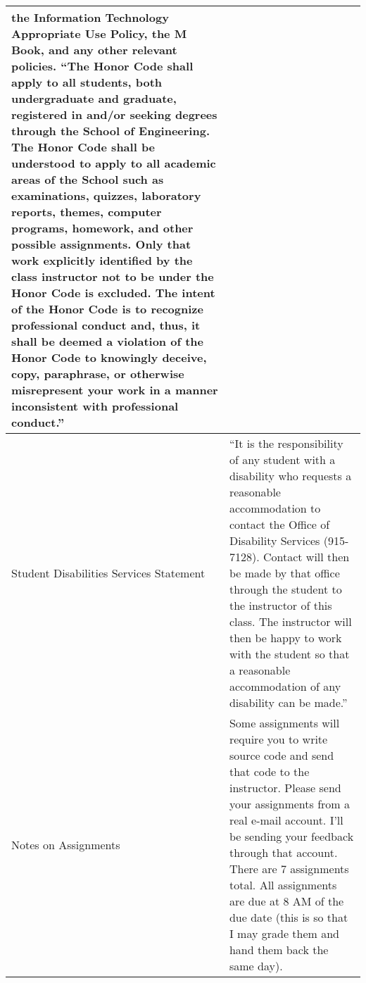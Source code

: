 \documentclass[letterpaper,10pt]{article}
\begin{document}
\begin{tabular}{|p{2in}|p{4in}|}
the Information Technology Appropriate Use Policy, the M Book, and any other
relevant policies.
``The Honor Code shall apply to all students, both undergraduate and graduate,
registered in and/or seeking degrees through the School of Engineering. The
Honor Code shall be understood to apply to all academic areas of the School
such as examinations, quizzes, laboratory reports, themes, computer programs,
homework, and other possible assignments. Only that work explicitly identified by
the class instructor not to be under the Honor Code is excluded. The intent of the
Honor Code is to recognize professional conduct and, thus, it shall be deemed a
violation of the Honor Code to knowingly deceive, copy, paraphrase, or otherwise
misrepresent your work in a manner inconsistent with professional conduct.''\\ \hline
Student Disabilities Services Statement& ``It is the responsibility of any student with a disability who requests a reasonable accommodation to contact the Office of Disability Services (915-7128). Contact will then be made by that office through the student to the instructor of this class. The instructor will then be happy to work with the student so that a reasonable accommodation of any disability can be made.''\\ \hline
Notes on Assignments&Some assignments will require you to write source code and send that code to the instructor. Please send your assignments from a real e-mail account. I'll be sending your feedback through that account. There are 7 assignments total. All assignments are due at 8 AM of the due date (this is so that I may grade them and hand them back the same day).\\ \hline
\end{tabular}
\end{document}
